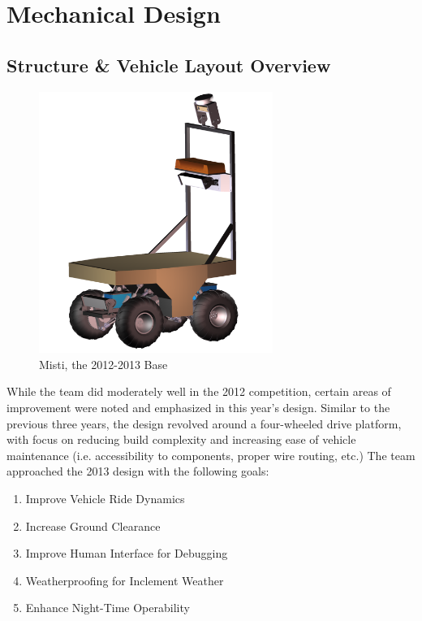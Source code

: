 \section{Mechanical Design}

\subsection{Structure \& Vehicle Layout Overview}


\begin{figure}[H]
\begin{center}
\includegraphics[width=3in]{./Pics/Misti_Vehicle.png}
\caption{Misti, the 2012-2013 Base}

\label{FIG:Misti}
\end{center}
\end{figure}

While the team did moderately well in the 2012 competition, certain areas of improvement were noted and emphasized in this year's design. Similar to the previous three years, the design revolved around a four-wheeled drive platform, with focus on reducing build complexity and increasing ease of vehicle maintenance (i.e. accessibility to components, proper wire routing, etc.) The team approached the 2013 design with the following goals:

\begin{enumerate}
\item Improve Vehicle Ride Dynamics
\item Increase Ground Clearance
\item Improve Human Interface for Debugging
\item Weatherproofing for Inclement Weather 
\item Enhance Night-Time Operability
\end{enumerate}

